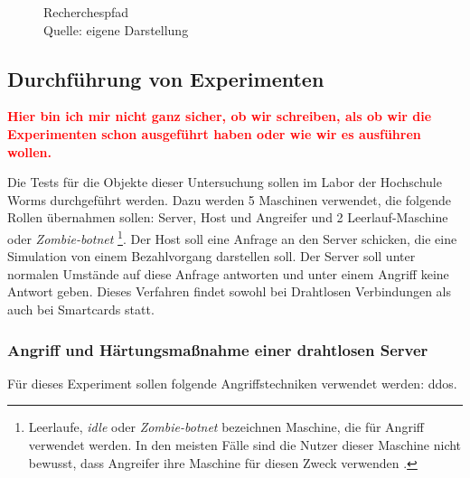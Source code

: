 \begin{landscape}
  \thispagestyle{mylandscape}
  \begin{figure}[h]  
  \centering
         \caption{Recherchespfad\\ Quelle: eigene Darstellung}
          \label{fig:diagramfrage}
  \end{figure}
\end{landscape}


\subsection{Durchführung von Experimenten}
\textcolor{red}{\textbf{Hier bin ich mir nicht ganz sicher, ob wir schreiben, als ob wir die Experimenten 
schon ausgeführt haben oder wie wir es ausführen wollen.}}

Die Tests für die Objekte dieser Untersuchung sollen im Labor der Hochschule Worms durchgeführt werden. 
Dazu werden 5 Maschinen verwendet, die folgende Rollen übernahmen sollen: Server, Host und Angreifer und 2
Leerlauf-Maschine oder \textit{Zombie-botnet} \footnote{Leerlaufe, \textit{idle} oder \textit{Zombie-botnet} 
bezeichnen Maschine, die für Angriff verwendet werden. In den meisten Fälle sind die Nutzer dieser Maschine nicht
bewusst, dass Angreifer ihre Maschine für diesen Zweck verwenden \cite{refart:XGDD}.}. Der Host soll eine 
Anfrage an den Server schicken, die eine Simulation von einem Bezahlvorgang darstellen soll. Der Server 
soll unter normalen Umstände auf diese Anfrage antworten und unter einem Angriff keine Antwort geben.
Dieses Verfahren findet sowohl bei Drahtlosen Verbindungen als auch bei Smartcards statt.


\subsubsection{Angriff und Härtungsmaßnahme einer drahtlosen Server}
Für dieses Experiment sollen folgende Angriffstechniken verwendet werden: \acrfull{ddos}.


